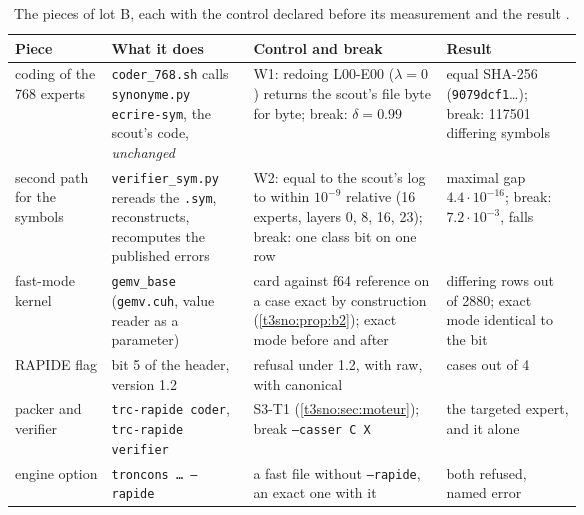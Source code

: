 \begin{table}[ht]
\centering\footnotesize
\caption[The pieces of lot B and their controls]{The pieces of lot B, each with the control declared before its measurement and the result \mes.}
\label{t3sno:tab:pieces}
\begin{tabularx}{\linewidth}{@{}>{\raggedright\arraybackslash}p{0.17\linewidth}>{\raggedright\arraybackslash}p{0.25\linewidth}>{\raggedright\arraybackslash}X>{\raggedright\arraybackslash}p{0.24\linewidth}@{}}
\toprule
Piece & What it does & Control and break & Result \\
\midrule
coding of the 768 experts & \texttt{coder\_768.sh} calls \texttt{synonyme.py ecrire-sym}, the scout's code, \emph{unchanged} & W1: redoing L00-E00 ($\lambda = 0$) returns the scout's file byte for byte; break: $\delta = 0.99$ & equal SHA-256 (\texttt{9079dcf1}…); break: \num{117501} differing symbols \\
second path for the symbols & \texttt{verifier\_sym.py} rereads the \texttt{.sym}, reconstructs, recomputes the published errors & W2: equal to the scout's log to within $10^{-9}$ relative (16 experts, layers 0, 8, 16, 23); break: one class bit on one row & maximal gap $4.4\cdot 10^{-16}$; break: $7.2\cdot 10^{-3}$, falls \\
fast-mode kernel & \texttt{gemv\_base} (\texttt{gemv.cuh}, value reader as a parameter) & card against f64 reference on a case exact by construction (\cref{t3sno:prop:b2}); exact mode before and after & 0 differing rows out of \num{2880}; exact mode identical to the bit \\
RAPIDE flag & bit 5 of the header, version 1.2 & refusal under 1.2, with raw, with canonical & 4 cases out of 4 \\
packer and verifier & \texttt{trc-rapide coder}, \texttt{trc-rapide verifier} & S3-T1 (\cref{t3sno:sec:moteur}); break \texttt{--casser C X} & the targeted expert, and it alone \\
engine option & \texttt{troncons … --rapide} & a fast file without \texttt{--rapide}, an exact one with it & both refused, named error \\
\bottomrule
\end{tabularx}
\end{table}

